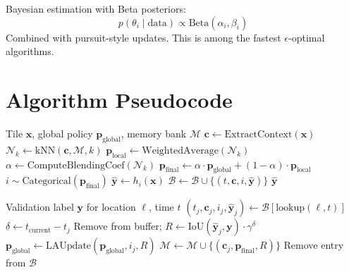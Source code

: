 \documentclass[11pt,a4paper]{article}
\begin{document}
Bayesian estimation with Beta posteriors:
\begin{equation}
p(\theta_i \mid \text{data}) \propto \text{Beta}(\alpha_i, \beta_i)
\end{equation}
Combined with pursuit-style updates. This is among the fastest $\epsilon$-optimal algorithms.


\section{Algorithm Pseudocode}
\label{app:algorithms}

\begin{algorithm}[H]
\caption{Framework Inference}
\begin{algorithmic}[1]
\Require Tile $\mathbf{x}$, global policy $\mathbf{p}_{\text{global}}$, memory bank $\mathcal{M}$
\State $\mathbf{c} \gets \text{ExtractContext}(\mathbf{x})$
\State $\mathcal{N}_k \gets \text{kNN}(\mathbf{c}, \mathcal{M}, k)$
\State $\mathbf{p}_{\text{local}} \gets \text{WeightedAverage}(\mathcal{N}_k)$
\State $\alpha \gets \text{ComputeBlendingCoef}(\mathcal{N}_k)$
\State $\mathbf{p}_{\text{final}} \gets \alpha \cdot \mathbf{p}_{\text{global}} + (1-\alpha) \cdot \mathbf{p}_{\text{local}}$
\State $i \sim \text{Categorical}(\mathbf{p}_{\text{final}})$
\State $\hat{\mathbf{y}} \gets h_i(\mathbf{x})$
\State $\mathcal{B} \gets \mathcal{B} \cup \{(t, \mathbf{c}, i, \hat{\mathbf{y}})\}$ 
\State \Return $\hat{\mathbf{y}}$
\end{algorithmic}
\end{algorithm}

\begin{algorithm}[H]
\caption{Label Arrival Processing}
\begin{algorithmic}[1]
\Require Validation label $\mathbf{y}$ for location $\ell$, time $t$
\State $(t_j, \mathbf{c}_j, i_j, \hat{\mathbf{y}}_j) \gets \mathcal{B}[\text{lookup}(\ell, t)]$
\State $\delta \gets t_{\text{current}} - t_j$ 
    \State Remove from buffer; \Return {}
\EndIf
\State $R \gets \text{IoU}(\hat{\mathbf{y}}_j, \mathbf{y}) \cdot \gamma^\delta$ 
\State $\mathbf{p}_{\text{global}} \gets \text{LAUpdate}(\mathbf{p}_{\text{global}}, i_j, R)$ 
\State $\mathcal{M} \gets \mathcal{M} \cup \{(\mathbf{c}_j, \mathbf{p}_{\text{final}}, R)\}$ 
\State Remove entry from $\mathcal{B}$
\end{algorithmic}
\end{algorithm}
\end{document}
